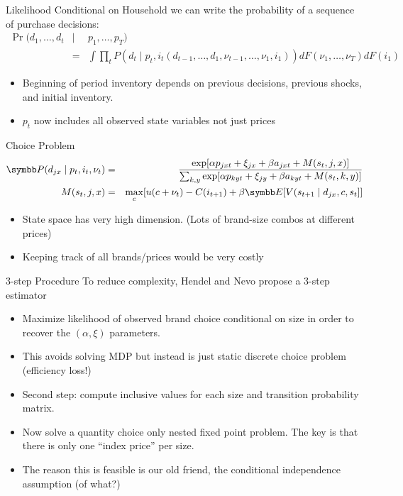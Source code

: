 \documentclass[aspectratio=169,11pt]{beamer}
\begin{document}
\begin{frame}{Likelihood}
Conditional on Household we can write the probability of a sequence of purchase decisions:
\begin{eqnarray*}
\Pr(d_1,\ldots,d_t &\mid& p_1,\ldots,p_T) \\
&=& \int \prod_t P(d_t \mid p_t, 
i_t(d_{t-1},\ldots,d_1, \nu_{t-1},\ldots,\nu_1,i_1))dF(\nu_1,\ldots,\nu_T) dF(i_1)
\end{eqnarray*}
\begin{itemize}
\item Beginning of period inventory depends on previous decisions, previous shocks, and initial inventory.
\item $p_t$ now includes all observed state variables not just prices
\end{itemize}
\end{frame}

\begin{frame}{Choice Problem}
\begin{eqnarray*}
\Pr(d_{jx} \mid p_t,i_t,\nu_t) &=& \frac{\exp[\alpha p_{jxt} + \xi_{jx} + \beta a_{jxt} + M(s_t,j,x)]}{\sum_{k,y} \exp[\alpha p_{kyt} + \xi_{jy} + \beta a_{kyt} + M(s_t,k,y)]}\\
M (s_t,j,x) &=& \max_c [ u(c+\nu_t) - C(i_{t+1}) + \beta \E[V(s_{t+1} \mid d_{jx},c,s_t]]\\
\end{eqnarray*}
\begin{itemize}
\item State space has very high dimension. (Lots of brand-size combos at different prices)
\item Keeping track of all brands/prices would be very costly
\end{itemize}
\end{frame}

\begin{frame}{3-step Procedure}
To reduce complexity, Hendel and Nevo propose a 3-step estimator
\begin{itemize}
\item Maximize likelihood of observed brand choice \alert{conditional} on size in order to recover the $(\alpha,\xi)$ parameters.
\item This avoids solving MDP but instead is just static discrete choice problem (efficiency loss!)
\item Second step: compute \alert{inclusive values} for each size and transition probability matrix.
\item Now solve a quantity choice only nested fixed point problem. The key is that there is \alert{only one ``index price'' per size}.
\item The reason this is feasible is our old friend, the \alert{conditional independence assumption} (of what?)
\end{itemize}
\end{frame}
\end{document}
